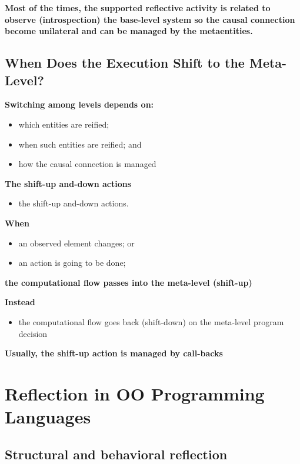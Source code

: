 \textbf{Most of the times, the supported reflective activity is related to observe (introspection) the base-level system so the causal connection become unilateral and can be managed by the metaentities.}

\subsection{When Does the Execution Shift to the Meta-Level?}
\textbf{Switching among levels depends on:}
\begin{itemize}
	\item which entities are reified;
	\item when such entities are reified; and
	\item how the causal connection is managed
\end{itemize}

\textbf{The shift-up and-down actions}
\begin{itemize}
	\item the shift-up and-down actions.
\end{itemize}

\textbf{When}
\begin{itemize}
	\item an observed element changes; or
	\item an action is going to be done;
\end{itemize}

\textbf{the computational flow passes into the meta-level (shift-up)}

\textbf{Instead}
\begin{itemize}
	\item the computational flow goes back (shift-down) on the meta-level program decision
\end{itemize}

\textbf{Usually, the shift-up action is managed by call-backs}

\section{Reflection in OO Programming Languages}

\subsection{Structural and behavioral reflection}

 





























